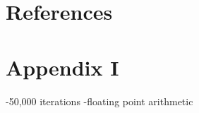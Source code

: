 \documentclass[3p,authoryear,twocolumn]{elsarticle} %
\begin{document}
\section{References}




\section{Appendix I}

-50,000 iterations
-floating point arithmetic
\end{document}
